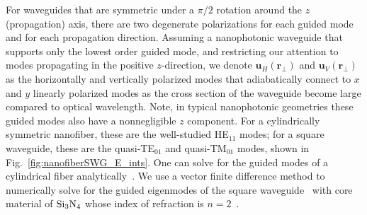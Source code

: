 \documentclass[preprint,aps,pra,onecolumn,superscriptaddress]{revtex4-1} %
\newcommand{\mbf}[1]{\mathbf{#1}}
\newcommand{\SWG}{square waveguide\xspace}%
\begin{document}
For waveguides that are symmetric under a $\pi/2$ rotation around the $z$ (propagation) axis, there are two degenerate polarizations for each guided mode and for each propagation direction.  Assuming a nanophotonic waveguide that supports only the lowest order guided mode, and restricting our attention to modes propagating in the positive $z$-direction, we denote $\mbf{u}_H(\mbf{r}_\perp)$ and  $\mbf{u}_V(\mbf{r}_\perp)$ as the horizontally and vertically polarized modes that adiabatically connect to $x$ and $y$ linearly polarized modes as the cross section of the waveguide become large compared to optical wavelength.  Note, in typical nanophotonic geometries these guided modes also have a nonnegligible $z$ component.  For a cylindrically symmetric nanofiber, these are the well-studied HE$_{11}$ modes; for a \SWG, these are the quasi-TE$_{01}$ and quasi-TM$_{01}$ modes, shown in Fig.~\eqref{fig:nanofiberSWG_E_ints}. One can solve for the guided modes of a cylindrical fiber analytically~\cite{Kien2004,Vetsch2010Opticala,Qi2016}. We use a vector finite difference method to numerically solve for the guided eigenmodes of the square waveguide~\cite{Fallahkhair2008} with core material of $ \rm{Si}_3\rm{N}_4 $ whose index of refraction is $ n=2 $~\cite{Lee2013}. 
\end{document}
